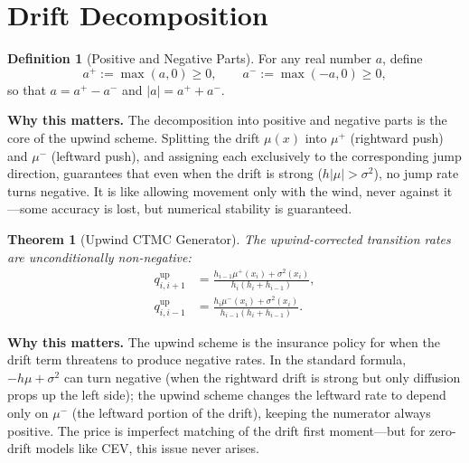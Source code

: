 \documentclass[11pt,a4paper,openany]{book}
\theoremstyle{definition}
\newtheorem{definition}{Definition}[chapter]
\theoremstyle{plain}
\newtheorem{theorem}{Theorem}[chapter]
\theoremstyle{remark}
\newcommand{\1}{\mathbbm{1}}
\begin{document}
\section{Drift Decomposition}

\begin{definition}[Positive and Negative Parts]
For any real number $a$, define
\[
a^{+} := \max(a, 0) \geq 0, \qquad a^{-} := \max(-a, 0) \geq 0,
\]
so that $a = a^{+} - a^{-}$ and $|a| = a^{+} + a^{-}$.
\end{definition}

\medskip
\noindent\textbf{Why this matters.} The decomposition into positive and negative parts is the core of the upwind scheme. Splitting the drift $\mu(x)$ into $\mu^+$ (rightward push) and $\mu^-$ (leftward push), and assigning each exclusively to the corresponding jump direction, guarantees that even when the drift is strong ($h|\mu| > \sigma^2$), no jump rate turns negative. It is like allowing movement only with the wind, never against it---some accuracy is lost, but numerical stability is guaranteed.

\begin{theorem}[Upwind CTMC Generator]
The upwind-corrected transition rates are unconditionally non-negative:
\[
\boxed{\begin{aligned}
q_{i,i+1}^{\text{up}} &= \frac{h_{i-1} \mu^{+}(x_{i}) + \sigma^{2}(x_{i})}{h_{i}(h_{i} + h_{i-1})}, \\[8pt]
q_{i,i-1}^{\text{up}} &= \frac{h_{i} \mu^{-}(x_{i}) + \sigma^{2}(x_{i})}{h_{i-1}(h_{i} + h_{i-1})}.
\end{aligned}}
\]
\end{theorem}

\medskip
\noindent\textbf{Why this matters.} The upwind scheme is the insurance policy for when the drift term threatens to produce negative rates. In the standard formula, $-h\mu + \sigma^2$ can turn negative (when the rightward drift is strong but only diffusion props up the left side); the upwind scheme changes the leftward rate to depend only on $\mu^-$ (the leftward portion of the drift), keeping the numerator always positive. The price is imperfect matching of the drift first moment---but for zero-drift models like CEV, this issue never arises.
\end{document}
